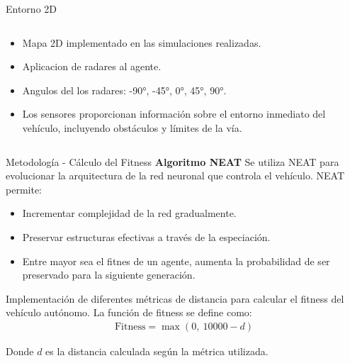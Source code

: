 \documentclass{beamer}
\begin{document}
\begin{frame}{Entorno 2D}
\begin{columns}
\begin{column}{0.5\textwidth}
\begin{itemize}
                \item Mapa 2D implementado en las simulaciones realizadas.
                \item Aplicacion de radares al agente.
                \item Angulos del los radares: -90°, -45°, 0°, 45°, 90°.
                \item Los sensores proporcionan información sobre el entorno inmediato del vehículo, incluyendo obstáculos y límites de la vía.
            \end{itemize}            
        \end{column}
    \end{columns}
\end{frame}

\begin{frame}{Metodología - Cálculo del Fitness}
\textbf{Algoritmo NEAT}
    Se utiliza NEAT para evolucionar la arquitectura de la red neuronal que controla el vehículo. NEAT permite:
\begin{itemize}
    \item Incrementar complejidad de la red gradualmente.
    \item Preservar estructuras efectivas a través de la especiación.
    \item Entre mayor sea el fitnes de un agente, aumenta la probabilidad de ser preservado para la siguiente generación.
\end{itemize}
Implementación de diferentes métricas de distancia para calcular el fitness del vehículo autónomo. La función de fitness se define como:
\begin{align*}
    \text{Fitness} = \max\left(0,\  10000 - d \right)
\end{align*}

Donde \( d \) es la distancia calculada según la métrica utilizada.

\end{frame}
\end{document}
